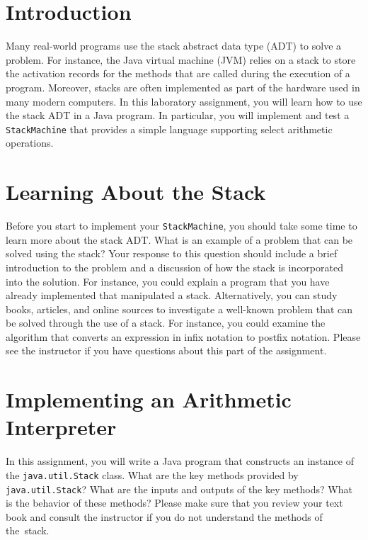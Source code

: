 

\usepackage[compact]{titlesec}


\section*{Introduction}

Many real-world programs use the stack abstract data type (ADT) to solve a problem.  For instance, the Java virtual
machine (JVM) relies on a stack to store the activation records for the methods that are called during the execution
of a program.  Moreover, stacks are often implemented as part of the hardware used in many modern computers. In this
laboratory assignment, you will learn how to use the stack ADT in a Java program.  In particular, you will implement
and test a {\tt StackMachine} that provides a simple language supporting select arithmetic operations.

\section*{Learning About the Stack}

Before you start to implement your {\tt StackMachine}, you should take some time to learn more about the stack ADT.
What is an example of a problem that can be solved using the stack? Your response to this question should include a
brief introduction to the problem and a discussion of how the stack is incorporated into the solution. For instance,
you could explain a program that you have already implemented that manipulated a stack. Alternatively, you can study
books, articles, and online sources to investigate a well-known problem that can be solved through the use of a stack.
For instance, you could examine the algorithm that converts an expression in infix notation to postfix notation.
Please see the instructor if you have questions about this part of the assignment.

\section*{Implementing an Arithmetic Interpreter}

In this assignment, you will write a Java program that constructs an instance of the {\tt java.util.Stack} class. What
are the key methods provided by {\tt java.util.Stack}? What are the inputs and outputs of the key methods? What is
the behavior of these methods? Please make sure that you review your text book and consult the instructor if you do
not understand the methods of \mbox{the stack}.

